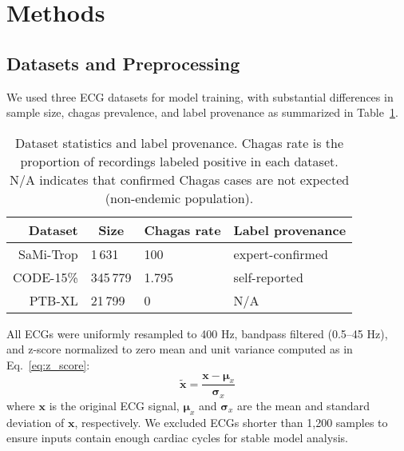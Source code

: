 \section{Methods}
\label{sec:methods}


\subsection{Datasets and Preprocessing}
\label{subsec:data}


We used three ECG datasets for model training, with substantial differences in sample size, chagas prevalence, and label provenance as summarized in Table~\ref{tab:dataset_stats}.

\begin{table}[!htp]
\centering
\begin{tabular}{rlll}
\toprule
Dataset & \multicolumn{1}{c}{Size} & \multicolumn{1}{c}{Chagas rate} & Label provenance \\
\midrule
SaMi-Trop & 1\,631   & 100 & expert-confirmed \\
CODE-15\% & 345\,779 & 1.795   & self-reported \\
PTB-XL    & 21\,799  & 0   & N/A \\
\bottomrule
\end{tabular}
\caption{Dataset statistics and label provenance. Chagas rate is the proportion of recordings labeled positive in each dataset. N/A indicates that confirmed Chagas cases are not expected (non-endemic population).}
\label{tab:dataset_stats}
\end{table}

All ECGs were uniformly resampled to 400 Hz, bandpass filtered (0.5–45 Hz), and z-score normalized to zero mean and unit variance computed as in Eq.~\ref{eq:z_score}:
\begin{equation}
\label{eq:z_score}
\tilde{\mathbf{x}} = \frac{\mathbf{x} - \boldsymbol{\mu}_x}{\boldsymbol{\sigma}_x}
\end{equation}
where $\mathbf{x}$ is the original ECG signal, $\boldsymbol{\mu}_x$ and $\boldsymbol{\sigma}_x$ are the mean and standard deviation of $\mathbf{x}$, respectively. We excluded ECGs shorter than 1,200 samples to ensure inputs contain enough cardiac cycles for stable model analysis.


